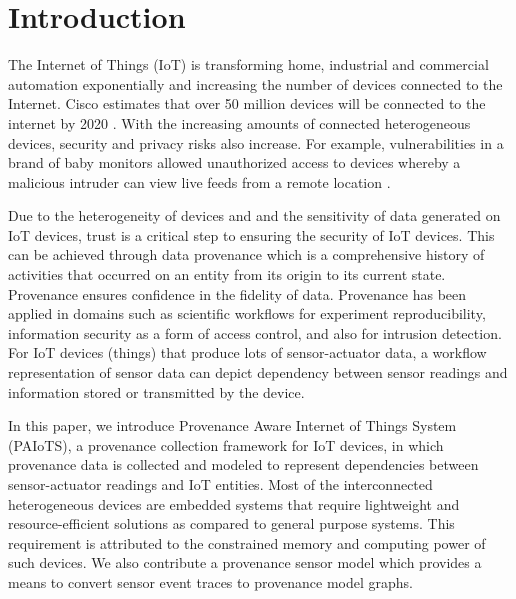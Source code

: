 \section{Introduction}
The Internet of Things (IoT) is transforming home, industrial and commercial automation exponentially and increasing the number of devices connected to the Internet. Cisco estimates that over 50 million devices will be connected to the internet by 2020 \cite{dave}. With the increasing amounts of connected heterogeneous devices, security and privacy risks also increase. For example, vulnerabilities in a brand of baby monitors allowed unauthorized access to devices whereby a malicious intruder can view live feeds from a remote location \cite{rapid7}. 

\par Due to the heterogeneity of devices and and the sensitivity of data generated on IoT devices, trust is a critical step to ensuring the security of IoT devices. This can be achieved through data provenance which is a comprehensive history of activities that occurred on an entity from its origin to its current state. Provenance ensures confidence in the fidelity of data. Provenance has been applied in domains such as scientific workflows for experiment reproducibility, information security as a form of access control, and also for intrusion detection. For IoT devices (things) that produce lots of sensor-actuator data, a workflow representation of sensor data can depict dependency between sensor readings and information stored or transmitted by the device. 

\par In this paper, we introduce Provenance Aware Internet of Things System (PAIoTS), a provenance collection framework for IoT devices, in which provenance data is collected and modeled to represent dependencies between sensor-actuator readings and IoT entities. Most of the interconnected heterogeneous devices are embedded systems that require lightweight and resource-efficient solutions as compared to general purpose
systems. This requirement is attributed to the constrained memory and computing power of such devices. We also contribute a provenance sensor model which provides a means to convert sensor event traces to provenance model graphs.


